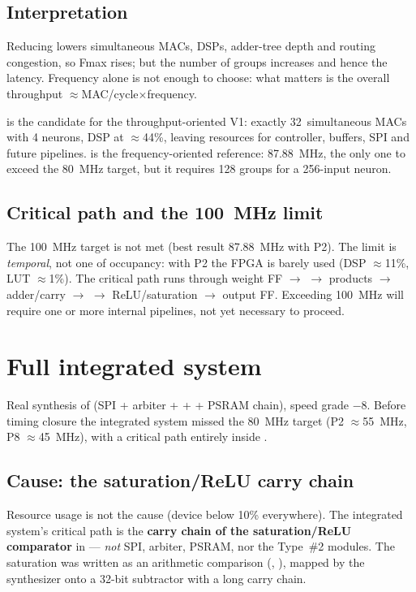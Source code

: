 \subsection{Interpretation}
Reducing  lowers simultaneous MACs, DSPs, adder-tree depth and routing
congestion, so Fmax rises; but the number of groups increases and hence the latency.
Frequency alone is not enough to choose: what matters is the overall throughput
$\approx$MAC/cycle$\times$frequency.

\begin{fnnote}
 is the candidate for the throughput-oriented V1: exactly 32~simultaneous
MACs with 4 neurons, DSP at $\approx$44\%, leaving resources for controller, buffers, SPI
and future pipelines.  is the frequency-oriented reference: 87.88~MHz,
the only one to exceed the 80~MHz target, but it requires 128 groups for a 256-input
neuron.
\end{fnnote}

\subsection{Critical path and the 100~MHz limit}
The 100~MHz target is not met (best result 87.88~MHz with P2). The limit is
\emph{temporal}, not one of occupancy: with P2 the FPGA is barely used (DSP $\approx$11\%,
LUT $\approx$1\%). The critical path runs through weight FF $\to$  $\to$
products $\to$ adder/carry $\to$  $\to$ ReLU/saturation $\to$ output FF.
Exceeding 100~MHz will require one or more internal pipelines, not yet necessary to
proceed.

\section{Full integrated system}
Real synthesis of  (SPI + arbiter +  +
 + PSRAM chain), speed grade $-8$. Before timing closure the integrated
system missed the 80~MHz target (P2 $\approx$55~MHz, P8 $\approx$45~MHz), with a critical
path entirely inside .

\subsection{Cause: the saturation/ReLU carry chain}
Resource usage is not the cause (device below 10\% everywhere). The integrated system's
critical path is the \textbf{ carry chain of the saturation/ReLU comparator} in
 --- \emph{not} SPI, arbiter, PSRAM, nor the Type~\#2 modules. The
saturation was written as an arithmetic comparison (, ),
mapped by the synthesizer onto a 32-bit subtractor with a long carry chain.

